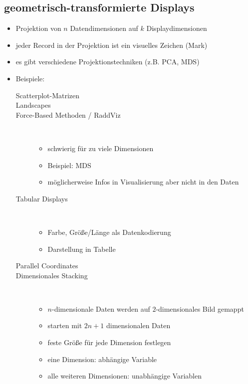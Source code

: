 \subsection{geometrisch-transformierte Displays}
\begin{itemize}
	\item Projektion von $n$ Datendimensionen auf $k$ Displaydimensionen
	\item jeder Record in der Projektion ist ein visuelles Zeichen (Mark)
	\item es gibt verschiedene Projektionstechniken (z.B. PCA, MDS)
	\item Beispiele:
		\begin{description}
			\item[Scatterplot-Matrizen]
			\item[Landscapes]
			\item[Force-Based Methoden / RaddViz] \ \\\vspace*{-\baselineskip}
				\begin{itemize}
					\item schwierig für zu viele Dimensionen
					\item Beispiel: MDS
					\item möglicherweise Infos in Visualisierung aber nicht in den Daten
				\end{itemize}
			\item[Tabular Displays] \ \\\vspace*{-\baselineskip}
				\begin{itemize}
					\item Farbe, Größe/Länge als Datenkodierung
					\item Darstellung in Tabelle
				\end{itemize}
			\item[Parallel Coordinates]
			\item[Dimensionales Stacking]\ \\\vspace*{-\baselineskip}
				\begin{itemize}
					\item $n$-dimensionale Daten werden auf $2$-dimensionales Bild gemappt
					\item starten mit $2n+1$ dimensionalen Daten
					\item feste Größe für jede Dimension festlegen
					\item eine Dimension: abhängige Variable
					\item alle weiteren Dimensionen: unabhängige Variablen
				\end{itemize}
				
		\end{description}
\end{itemize}
